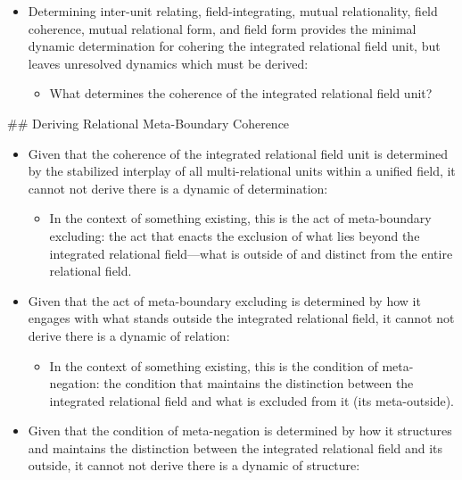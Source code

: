 \documentclass[11pt]{article}
\begin{document}
\begin{itemize}
\item Determining inter-unit relating, field-integrating, mutual relationality, field coherence, mutual relational form, and field form provides the minimal dynamic determination for cohering the integrated relational field unit, but leaves unresolved dynamics which must be derived:

\begin{itemize}
\item What determines the coherence of the integrated relational field unit?
\end{itemize}
\end{itemize}
\#\# Deriving Relational Meta-Boundary Coherence
\begin{itemize}
\item Given that the coherence of the integrated relational field unit is determined by the stabilized interplay of all multi-relational units within a unified field, it cannot not derive there is a dynamic of determination:

\begin{itemize}
\item In the context of something existing, this is the act of meta-boundary excluding: the act that enacts the exclusion of what lies beyond the integrated relational field—what is outside of and distinct from the entire relational field.
\end{itemize}

\item Given that the act of meta-boundary excluding is determined by how it engages with what stands outside the integrated relational field, it cannot not derive there is a dynamic of relation:

\begin{itemize}
\item In the context of something existing, this is the condition of meta-negation: the condition that maintains the distinction between the integrated relational field and what is excluded from it (its meta-outside).
\end{itemize}

\item Given that the condition of meta-negation is determined by how it structures and maintains the distinction between the integrated relational field and its outside, it cannot not derive there is a dynamic of structure:


\end{itemize}
\end{document}
